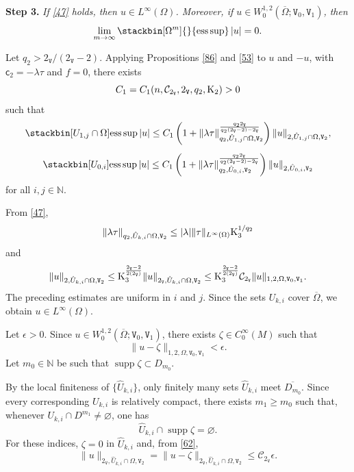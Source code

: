 \documentclass[reqno, 11pt, a4paper]{amsart}
\numberwithin{equation}{section}
\newcommand{\iwe}{ \tau}
\newcommand{\xv}{2_{\mathtt{V}}}
\newcommand{\ck}{\textnormal K}
\newcommand{\fc}{\mathsf c}
\newcommand{\spt}{\operatorname{supp}}
\newcommand{\wghtv}{\mathtt{V}}
\newcommand{\qxp}{q}
\begin{document}
\medskip

{\bf Step 3.} {\it If \ref{47} holds, then $u\in L^\infty(\Omega)$. Moreover, if $u\in W^{1,2}_0(\overline\Omega;\wghtv_0,\wghtv_1)$, then}
\begin{gather}\label{88}
\lim_{m\rightarrow\infty}
\stackbin[\Omega^m]{}{\operatorname{ess}\sup}\,|u|=0.
\end{gather}

Let $\qxp_2>\xv/(\xv-2)$. Applying Propositions \ref{86} and \ref{53} to $u$ and $-u$, with $\fc_2=-\lambda\iwe$ and $f=0$, there exists
$$
C_1=C_1(n,\mathcal C_{\xv},\xv,\qxp_2,\ck_2)>0
$$
such that
\begin{gather*}
\stackbin[U_{1,j}\cap\Omega]{}{\operatorname{ess}\sup}\,|u|
\leq
C_1\left(
1+\|\lambda\iwe\|_{\qxp_2,\hat U_{1,j}\cap\Omega,\wghtv_2}^{\frac{\qxp_2\xv}{\qxp_2(\xv-2)-\xv}}
\right)
\|u\|_{2,\hat U_{1,j}\cap\Omega,\wghtv_2},\\[5pt]
\stackbin[U_{0,i}]{}{\operatorname{ess}\sup}\,|u|
\leq
C_1\left(
1+\|\lambda\iwe\|_{\qxp_2,\hat U_{0,i},\wghtv_2}^{\frac{\qxp_2\xv}{\qxp_2(\xv-2)-\xv}}
\right)
\|u\|_{2,\hat U_{0,i},\wghtv_2}
\end{gather*}
for all $i,j\in\mathbb N$.

From \ref{47},
$$
\|\lambda\iwe\|_{\qxp_2,\hat U_{k,i}\cap\Omega,\wghtv_2}
\leq
|\lambda|\|\iwe\|_{L^\infty(\Omega)}\ck_3^{1/\qxp_2}
$$
and
$$
\|u\|_{2,\hat U_{k,i}\cap\Omega,\wghtv_2}
\leq
\ck_3^{\frac{\xv-2}{2(\xv)}}
\|u\|_{\xv,\hat U_{k,i}\cap\Omega,\wghtv_2}
\leq
\ck_3^{\frac{\xv-2}{2(\xv)}}\mathcal C_{\xv}
\|u\|_{1,2,\Omega,\wghtv_0,\wghtv_1}.
$$
The preceding estimates are uniform in $i$ and $j$. Since the sets $U_{k,i}$ cover $\overline\Omega$, we obtain $u\in L^\infty(\Omega)$.


Let $\epsilon>0$. Since $u\in W^{1,2}_0(\overline\Omega;\wghtv_0,\wghtv_1)$, there exists $\zeta\in C_0^\infty(M)$ such that
$$
\|u-\zeta\|_{1,2,\Omega,\wghtv_0,\wghtv_1}<\epsilon.
$$
Let $m_0\in\mathbb N$ be such that $\spt\zeta\subset D_{m_0}$.

By the local finiteness of $\{\hat U_{k,i}\}$, only finitely many sets $\hat U_{k,i}$ meet $\overline{D_{m_0}}$. Since every corresponding $U_{k,i}$ is relatively compact, there exists $m_1\geq m_0$ such that, whenever $U_{k,i}\cap D^{m_1}\neq\varnothing$, one has
$$
\hat U_{k,i}\cap\spt\zeta=\varnothing.
$$
For these indices, $\zeta=0$ in $\hat U_{k,i}$ and, from \eqref{62},
$$
\|u\|_{\xv,\hat U_{k,i}\cap\Omega,\wghtv_2}
=
\|u-\zeta\|_{\xv,\hat U_{k,i}\cap\Omega,\wghtv_2}
\leq
\mathcal C_{\xv}\epsilon.
$$
\end{document}
